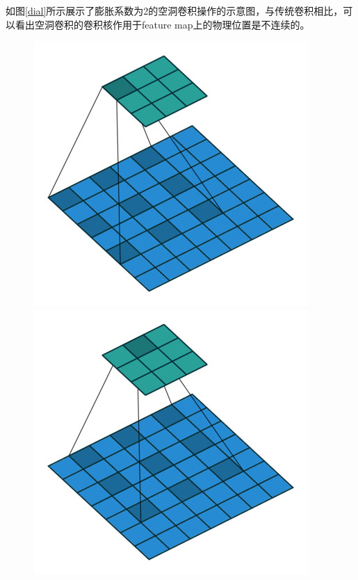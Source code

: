 \documentclass[cn]{elegantbook}
\begin{document}
如图\ref{dial}所示展示了膨胀系数为2的空洞卷积操作的示意图，与传统卷积相比，可以看出空洞卷积的卷积核作用于feature map上的物理位置是不连续的。
\begin{figure}[!h]
	\centering
	\begin{minipage}[t]{0.3\textwidth}
		\centering
		\includegraphics[width=\textwidth]{images/dilation-00.jpg}
	\end{minipage}
	\begin{minipage}[t]{0.3\textwidth}
		\centering
		\includegraphics[width=\textwidth]{images/dilation-01.jpg}

\end{minipage}
\end{figure}
\end{document}
